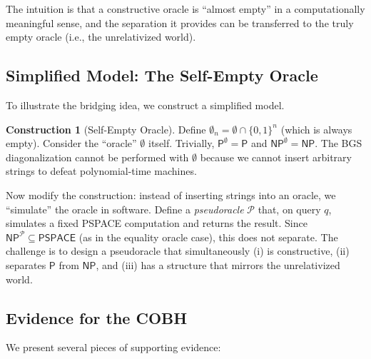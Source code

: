 \documentclass[11pt,a4paper]{article}
\theoremstyle{plain}
\theoremstyle{definition}
\newtheorem{construction}[theorem]{Construction}
\theoremstyle{remark}
\newcommand{\PP}{\mathsf{P}}
\newcommand{\NP}{\mathsf{NP}}
\newcommand{\PSPACE}{\mathsf{PSPACE}}
\newcommand{\bits}{\{0,1\}}
\begin{document}
The intuition is that a constructive oracle is ``almost empty'' in a
computationally meaningful sense, and the separation it provides can be
transferred to the truly empty oracle (i.e., the unrelativized world).

\subsection{Simplified Model: The Self-Empty Oracle}

To illustrate the bridging idea, we construct a simplified model.

\begin{construction}[Self-Empty Oracle]
Define $\emptyset_n = \emptyset \cap \bits^n$ (which is always empty).  Consider
the ``oracle'' $\emptyset$ itself.  Trivially, $\PP^{\emptyset} = \PP$ and
$\NP^{\emptyset} = \NP$.  The BGS diagonalization cannot be performed with
$\emptyset$ because we cannot insert arbitrary strings to defeat polynomial-time
machines.

Now modify the construction: instead of inserting strings into an oracle, we
``simulate'' the oracle in software.  Define a \emph{pseudoracle} $\mathcal{P}$
that, on query $q$, simulates a fixed PSPACE computation and returns the
result.  Since $\NP^{\mathcal{P}} \subseteq \PSPACE$ (as in the equality oracle
case), this does not separate.  The challenge is to design a pseudoracle that
simultaneously (i) is constructive, (ii) separates $\PP$ from $\NP$, and (iii)
has a structure that mirrors the unrelativized world.
\end{construction}

\subsection{Evidence for the COBH}

We present several pieces of supporting evidence:
\end{document}
